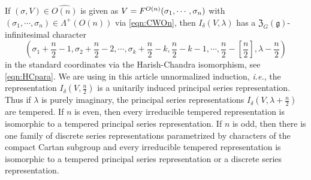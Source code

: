 If $(\sigma, V) \in \widehat{O(n)}$ is given 
 as $V=F^{{O(n)}}({\sigma_1, \cdots,\sigma_n})$
with $(\sigma_1,\cdots,\sigma_n) \in \Lambda^+(O(n))$
 via \eqref{eqn:CWOn}, 
 then $I_{\delta}(V,\lambda)$ has 
a 
${\mathfrak {Z}}_G({\mathfrak{g}})$-infinitesimal character
\begin{equation}
\label{eqn:ZGinfI}
 (\sigma_1+\frac {n} 2-1, \sigma_2+\frac {n} 2-2, \cdots, 
  \sigma_k+\frac {n} 2-k, \frac {n} 2-k-1, \cdots, \frac {n} 2-[\frac n 2], 
  \lambda-\frac {n} 2)
\end{equation}
in the standard coordinates
 via the 
 Harish-Chandra isomorphism, 
 see \eqref{eqn:HCpara}. 
We are using in this article
 unnormalized induction, 
{\it{i.e.}}, 
 the representation $I_{\delta}({V}, \frac n 2)$ is a unitarily induced principal series representation. 
Thus if $\lambda$ is purely imaginary, 
 the principal series representations
 $I_\delta(V,\lambda + \frac n 2)$ are 
tempered.  
If $n$ is even, 
 then every irreducible tempered representation is isomorphic
 to a tempered principal series representation.  
If $n$ is odd, 
 then there is one family of discrete series representations
 parametrized by characters
 of the compact Cartan subgroup
 and every irreducible tempered representation
 is isomorphic to a tempered principal series representation
 or a discrete series representation. 



\medskip

